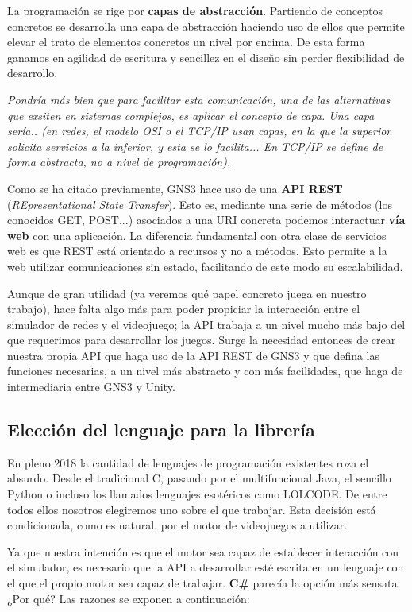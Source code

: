 La programación se rige por \textbf{capas de abstracción}. Partiendo de conceptos concretos se desarrolla una capa de abstracción haciendo uso de ellos que permite elevar el trato de elementos concretos un nivel por encima\cite{abstraction}. De esta forma ganamos en agilidad de escritura y sencillez en el diseño sin perder flexibilidad de desarrollo.

\textit{Pondría más bien que para facilitar esta comunicación, una de las alternativas que exsiten en sistemas complejos, es aplicar el concepto de capa. Una capa sería.. (en redes, el modelo OSI o el TCP/IP usan capas, en la que la superior solicita servicios a la inferior, y esta se lo facilita... En TCP/IP se define de forma abstracta, no a nivel de programación).}

Como se ha citado previamente, GNS3 hace uso de una \textbf{API REST} (\textit{REpresentational State Transfer}). Esto es, mediante una serie de métodos (los conocidos GET, POST...) asociados a una URI concreta podemos interactuar \textbf{vía web} con una aplicación. La diferencia fundamental con otra clase de servicios web es que REST está orientado a recursos y no a métodos. Esto permite a la web utilizar comunicaciones sin estado, facilitando de este modo su escalabilidad\cite{REST}.

Aunque de gran utilidad (ya veremos qué papel concreto juega en nuestro trabajo), hace falta algo más para poder propiciar la interacción entre el simulador de redes y el videojuego; la API trabaja a un nivel mucho más bajo del que requerimos para desarrollar los juegos. Surge la necesidad entonces de crear nuestra propia API que haga uso de la API REST de GNS3 y que defina las funciones necesarias, a un nivel más abstracto y con más facilidades, que haga de intermediaria entre GNS3 y Unity.

\subsection{Elección del lenguaje para la librería}
En pleno 2018 la cantidad de lenguajes de programación existentes roza el absurdo. Desde el tradicional C, pasando por el multifuncional Java, el sencillo Python o incluso los llamados lenguajes esotéricos como LOLCODE\cite{esotericlang}. De entre todos ellos nosotros elegiremos uno sobre el que trabajar. Esta decisión está condicionada, como es natural, por el motor de videojuegos a utilizar.

Ya que nuestra intención es que el motor sea capaz de establecer interacción con el simulador, es necesario que la API a desarrollar esté escrita en un lenguaje con el que el propio motor sea capaz de trabajar. \textbf{C\#} parecía la opción más sensata. ¿Por qué? Las razones se exponen a continuación:

